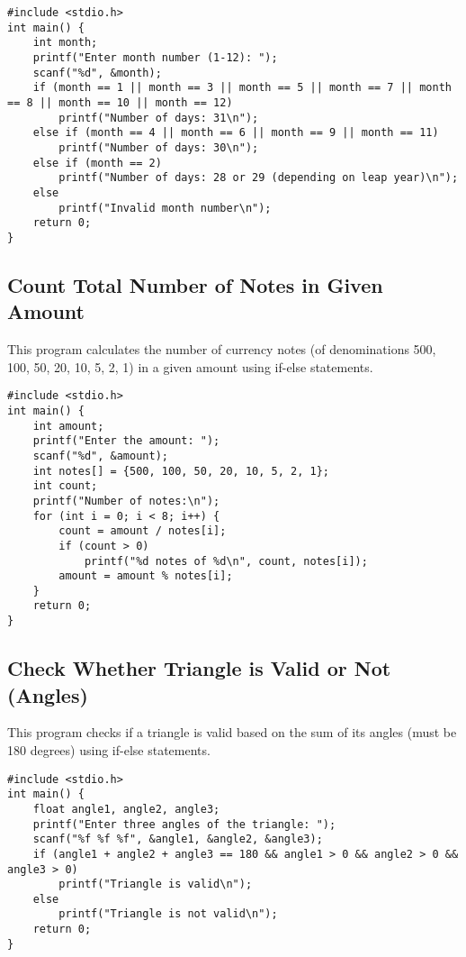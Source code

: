 \documentclass[a4paper,12pt]{article}
\begin{document}
\begin{lstlisting}[caption={Input Month Number and Print Number of Days in That Month}]
#include <stdio.h>
int main() {
    int month;
    printf("Enter month number (1-12): ");
    scanf("%d", &month);
    if (month == 1 || month == 3 || month == 5 || month == 7 || month == 8 || month == 10 || month == 12)
        printf("Number of days: 31\n");
    else if (month == 4 || month == 6 || month == 9 || month == 11)
        printf("Number of days: 30\n");
    else if (month == 2)
        printf("Number of days: 28 or 29 (depending on leap year)\n");
    else
        printf("Invalid month number\n");
    return 0;
}
\end{lstlisting}

\newpage

\subsection{Count Total Number of Notes in Given Amount}
This program calculates the number of currency notes (of denominations 500, 100, 50, 20, 10, 5, 2, 1) in a given amount using if-else statements.

\begin{lstlisting}[caption={Count Total Number of Notes in Given Amount}]
#include <stdio.h>
int main() {
    int amount;
    printf("Enter the amount: ");
    scanf("%d", &amount);
    int notes[] = {500, 100, 50, 20, 10, 5, 2, 1};
    int count;
    printf("Number of notes:\n");
    for (int i = 0; i < 8; i++) {
        count = amount / notes[i];
        if (count > 0)
            printf("%d notes of %d\n", count, notes[i]);
        amount = amount % notes[i];
    }
    return 0;
}
\end{lstlisting}

\newpage

\subsection{Check Whether Triangle is Valid or Not (Angles)}
This program checks if a triangle is valid based on the sum of its angles (must be 180 degrees) using if-else statements.

\begin{lstlisting}[caption={Check Whether Triangle is Valid or Not (Angles)}]
#include <stdio.h>
int main() {
    float angle1, angle2, angle3;
    printf("Enter three angles of the triangle: ");
    scanf("%f %f %f", &angle1, &angle2, &angle3);
    if (angle1 + angle2 + angle3 == 180 && angle1 > 0 && angle2 > 0 && angle3 > 0)
        printf("Triangle is valid\n");
    else
        printf("Triangle is not valid\n");
    return 0;
}
\end{lstlisting}
\end{document}
